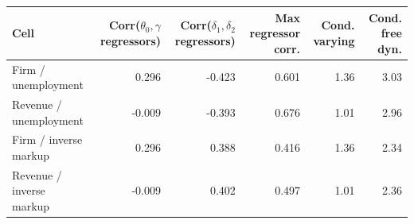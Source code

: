 \begin{tabular}{@{}lrrrrr@{}}
\toprule
Cell & Corr($\theta_0,\gamma$ regressors) & Corr($\delta_1,\delta_2$ regressors) & Max regressor corr. & Cond. varying & Cond. free dyn. \\
\midrule
Firm / unemployment & 0.296 & -0.423 & 0.601 & 1.36 & 3.03 \\
Revenue / unemployment & -0.009 & -0.393 & 0.676 & 1.01 & 2.96 \\
Firm / inverse markup & 0.296 & 0.388 & 0.416 & 1.36 & 2.34 \\
Revenue / inverse markup & -0.009 & 0.402 & 0.497 & 1.01 & 2.36 \\
\bottomrule
\end{tabular}
